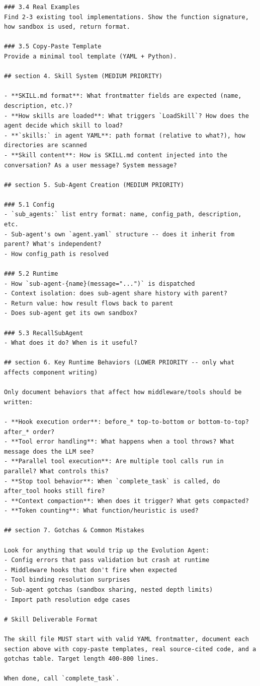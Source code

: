 \begin{tcolorbox}
\begin{lstlisting}
### 3.4 Real Examples
Find 2-3 existing tool implementations. Show the function signature, how sandbox is used, return format.

### 3.5 Copy-Paste Template
Provide a minimal tool template (YAML + Python).

## section 4. Skill System (MEDIUM PRIORITY)

- **SKILL.md format**: What frontmatter fields are expected (name, description, etc.)?
- **How skills are loaded**: What triggers `LoadSkill`? How does the agent decide which skill to load?
- **`skills:` in agent YAML**: path format (relative to what?), how directories are scanned
- **Skill content**: How is SKILL.md content injected into the conversation? As a user message? System message?

## section 5. Sub-Agent Creation (MEDIUM PRIORITY)

### 5.1 Config
- `sub_agents:` list entry format: name, config_path, description, etc.
- Sub-agent's own `agent.yaml` structure -- does it inherit from parent? What's independent?
- How config_path is resolved

### 5.2 Runtime
- How `sub-agent-{name}(message="...")` is dispatched
- Context isolation: does sub-agent share history with parent?
- Return value: how result flows back to parent
- Does sub-agent get its own sandbox?

### 5.3 RecallSubAgent
- What does it do? When is it useful?

## section 6. Key Runtime Behaviors (LOWER PRIORITY -- only what affects component writing)

Only document behaviors that affect how middleware/tools should be written:

- **Hook execution order**: before_* top-to-bottom or bottom-to-top? after_* order?
- **Tool error handling**: What happens when a tool throws? What message does the LLM see?
- **Parallel tool execution**: Are multiple tool calls run in parallel? What controls this?
- **Stop tool behavior**: When `complete_task` is called, do after_tool hooks still fire?
- **Context compaction**: When does it trigger? What gets compacted?
- **Token counting**: What function/heuristic is used?

## section 7. Gotchas & Common Mistakes

Look for anything that would trip up the Evolution Agent:
- Config errors that pass validation but crash at runtime
- Middleware hooks that don't fire when expected
- Tool binding resolution surprises
- Sub-agent gotchas (sandbox sharing, nested depth limits)
- Import path resolution edge cases

# Skill Deliverable Format

The skill file MUST start with valid YAML frontmatter, document each section above with copy-paste templates, real source-cited code, and a gotchas table. Target length 400-800 lines.

When done, call `complete_task`.
\end{lstlisting}
\end{tcolorbox}

